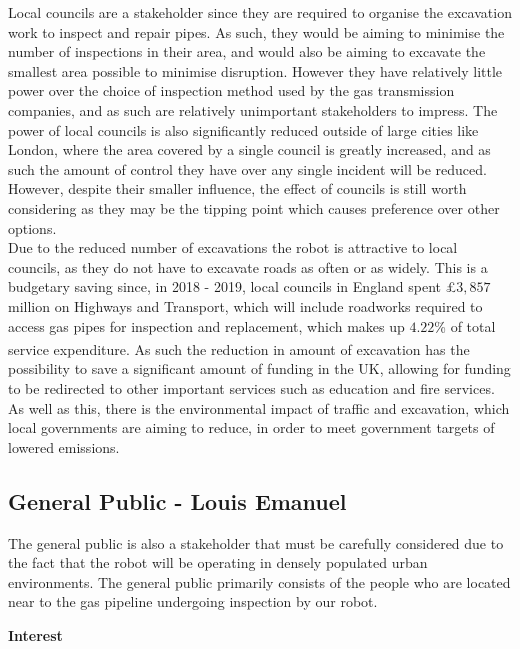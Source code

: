 \documentclass[11pt]{article}		%
\begin{document}
			Local councils are a stakeholder since they are required to organise the excavation work to inspect and repair pipes.
			As such, they would be aiming to minimise the number of inspections in their area, and would also be aiming to excavate the smallest area possible to minimise disruption.
			However they have relatively little power over the choice of inspection method used by the gas transmission companies, and as such are relatively unimportant stakeholders to impress.
			The power of local councils is also significantly reduced outside of large cities like London, where the area covered by a single council is greatly increased, and as such the amount of control they have over any single incident will be reduced.
			However, despite their smaller influence, the effect of councils is still worth considering as they may be the tipping point which causes preference over other options.
			\\
			Due to the reduced number of excavations the robot is attractive to local councils, as they do not have to excavate roads as often or as widely.
			This is a budgetary saving since, in 2018 - 2019, local councils in England spent £$3,857$ million on Highways and Transport, which will include roadworks required to access gas pipes for inspection and replacement, which makes up $4.22$\% of total service expenditure\textsuperscript{\cite{ministry2020local}}.
			As such the reduction in amount of excavation has the possibility to save a significant amount of funding in the UK, allowing for funding to be redirected to other important services such as education and fire services.
			As well as this, there is the environmental impact of traffic and excavation, which local governments are aiming to reduce, in order to meet government targets of lowered emissions.
		
		\subsection[General Public]{General Public - Louis Emanuel}
		The general public is also a stakeholder that must be carefully considered due to the fact that the robot will be operating in densely populated urban environments. The general public primarily consists of the people who are located near to the gas pipeline undergoing inspection by our robot.
		
		\textbf{Interest}
		
\end{document}
